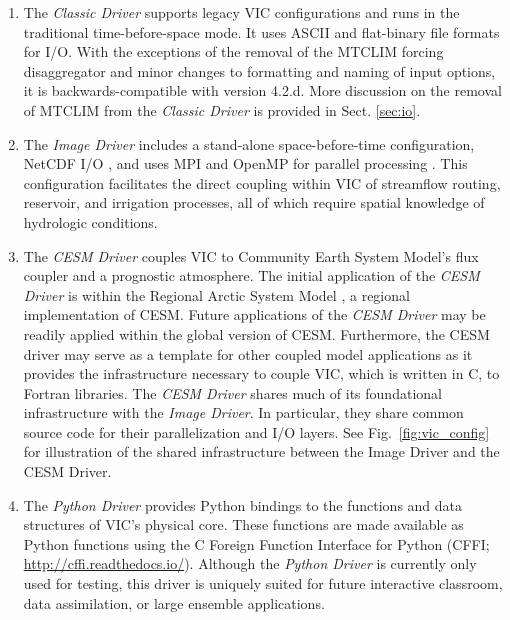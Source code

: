 \documentclass[gmd, manuscript]{copernicus}
\begin{document}
    \begin{enumerate}
      \item  The \textit{Classic Driver} supports legacy VIC configurations and runs in the traditional time-before-space mode. It uses ASCII and flat-binary file formats for I/O.  With the exceptions of the removal of the MTCLIM forcing disaggregator and minor changes to formatting and naming of input options, it is backwards-compatible with version 4.2.d. More discussion on the removal of MTCLIM from the \textit{Classic Driver} is provided in Sect. \ref{sec:io}.

      \item The \textit{Image Driver} includes a stand-alone space-before-time configuration, NetCDF I/O \citep{Rew_1990}, and uses MPI and OpenMP for parallel processing \citep{Gropp_1996,Dagum_1998}. This configuration facilitates the direct coupling within VIC of streamflow routing, reservoir, and irrigation processes, all of which require spatial knowledge of hydrologic conditions.

      \item The \textit{CESM Driver} couples VIC to Community Earth System Model's \citep[CESM;][]{Hurrell_2013} flux coupler \citep[CPL7;][]{Craig_2012} and a prognostic atmosphere. The initial application of the \textit{CESM Driver} is within the Regional Arctic System Model \citep[RASM;][]{Hamman_2016a}, a regional implementation of CESM. Future applications of the \textit{CESM Driver} may be readily applied within the global version of CESM. Furthermore, the CESM driver may serve as a template for other coupled model applications as it provides the infrastructure necessary to couple VIC, which is written in C, to Fortran libraries. The \textit{CESM Driver} shares much of its foundational infrastructure with the \textit{Image Driver}. In particular, they share common source code for their parallelization and I/O layers. See Fig.~\ref{fig:vic_config} for illustration of the shared infrastructure between the Image Driver and the CESM Driver.

      \item The \textit{Python Driver} provides Python bindings to the functions and data structures of VIC’s physical core. These functions are made available as Python functions using the C Foreign Function Interface for Python (CFFI; \url{http://cffi.readthedocs.io/}). Although the \textit{Python Driver} is currently only used for testing, this driver is uniquely suited for future interactive classroom, data assimilation, or large ensemble applications.
    \end{enumerate}
\end{document}

